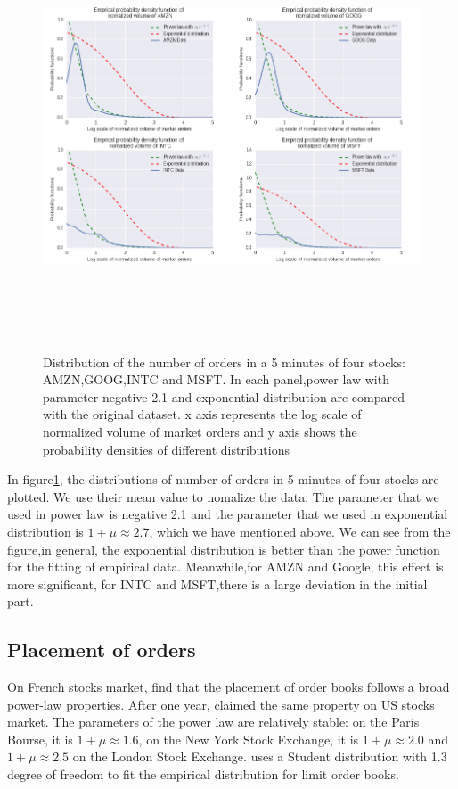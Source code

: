 \begin{figure}[hbtp]
	\begin{center}
		\includegraphics[width=6in,height=5in]{figures/volume.png}
	\end{center}
	\caption{Distribution of the number of orders in a 5 minutes of four stocks: AMZN,GOOG,INTC and MSFT. In each panel,power law with parameter negative 2.1 and exponential distribution  are compared with the original dataset. x axis represents the log scale of normalized volume of market orders and y axis shows the probability densities of different distributions} \label{fig:volume}
\end{figure}

In figure\ref{fig:volume}, the distributions of number of orders in 5 minutes of four stocks are plotted. We use their mean value to nomalize the data. The parameter that we used in power law is negative 2.1 and the parameter that we used in exponential distribution is $1+\mu \approx 2.7$, which we have mentioned above. We can see from the figure,in general, the exponential distribution is better than the power function for the fitting of empirical data. Meanwhile,for AMZN and Google, this effect is more significant, for INTC and MSFT,there is a large deviation in the initial part.

\subsection{Placement of orders}
On French stocks market, \cite{bouchaud2002statistical} find that the placement of order books follows a broad power-law properties. After one year, \cite{potters2003more} claimed the same property on US stocks market. The parameters of the power law are relatively stable: on the Paris Bourse, it is $1+\mu \approx 1.6$, on the New York Stock Exchange, it is $1+\mu \approx 2.0$ and $1+\mu \approx 2.5$ on the London Stock Exchange. \cite{mike2008empirical} uses a Student distribution with 1.3 degree of freedom to fit the empirical distribution for limit order books. 

